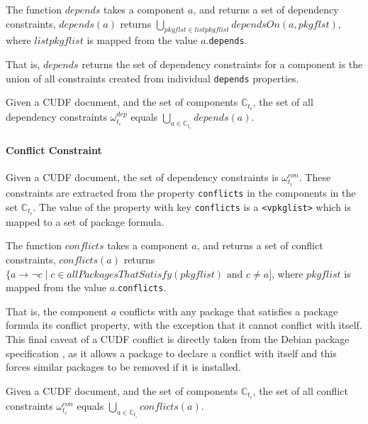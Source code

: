 \begin{defs}
The function $depends$ takes a component $a$, and returns a set of dependency  constraints,
$depends(a)$ returns $\bigcup \limits_{pkgflst \in listpkgflist} dependsOn(a,pkgflst)$, where $listpkgflist$ is mapped from the value $a$.\texttt{depends}.
\end{defs}
That is, $depends$ returns the set of dependency  constraints for a component is the union of all constraints created from individual \verb+depends+ properties.

\begin{defs}
Given a CUDF document, and the set of components $\mathbb{C}_{t_i}$,
the set of all dependency  constraints $\omega_{t_i}^{dep}$ equals $\bigcup \limits_{a \in \mathbb{C}_{t_i}} depends(a)$.
\end{defs}

\paragraph{Conflict Constraint}
Given a CUDF document, the set of dependency  constraints is $\omega_{t_i}^{con}$.
These constraints are extracted from the property \texttt{conflicts} in the components in the set $\mathbb{C}_{t_i}$.
The value of the property with key \texttt{conflicts} is a \texttt{<vpkglist>} which is mapped to a set of package formula.

\begin{defs}
The function $conflicts$ takes a component $a$, and returns a set of conflict  constraints,
$conflicts(a)$ returns $\{a \rightarrow \neg c \mid c \in allPackagesThatSatisfy(pkgflist) \mbox { and } c \not = a]$, where $pkgflist$ is mapped from the value $a$.\texttt{conflicts}.
\end{defs}
That is, the component $a$ conflicts with any package that satisfies a package formula its conflict property,
with the exception that it cannot conflict with itself.
This final caveat of a CUDF conflict is directly taken from the Debian package specification \citep{Barth2005}, 
as it allows a package to declare a conflict with itself and this forces similar packages to be removed if it is installed.  

\begin{defs}
Given a CUDF document, and the set of components $\mathbb{C}_{t_i}$,
the set of all conflict  constraints $\omega_{t_i}^{con}$ equals $\bigcup \limits_{a\in \mathbb{C}_{t_i}} conflicts(a)$.
\end{defs} 

